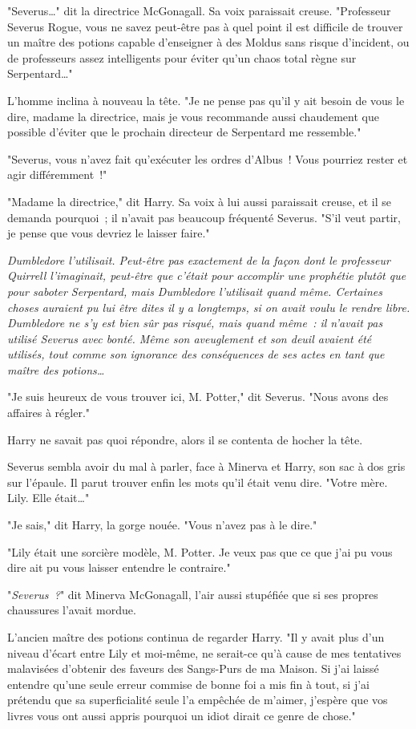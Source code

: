 "Severus…" dit la directrice McGonagall. Sa voix paraissait creuse. "Professeur Severus Rogue, vous ne savez peut-être pas à quel point il est difficile de trouver un maître des potions capable d'enseigner à des Moldus sans risque d'incident, ou de professeurs assez intelligents pour éviter qu'un chaos total règne sur Serpentard…"

L'homme inclina à nouveau la tête. "Je ne pense pas qu'il y ait besoin de vous le dire, madame la directrice, mais je vous recommande aussi chaudement que possible d'éviter que le prochain directeur de Serpentard me ressemble."

"Severus, vous n'avez fait qu'exécuter les ordres d'Albus~! Vous pourriez rester et agir différemment~!"

"Madame la directrice," dit Harry. Sa voix à lui aussi paraissait creuse, et il se demanda pourquoi~; il n'avait pas beaucoup fréquenté Severus. "S'il veut partir, je pense que vous devriez le laisser faire."

\emph{Dumbledore l'utilisait. Peut-être pas exactement de la façon dont le professeur Quirrell l'imaginait, peut-être que c'était pour accomplir une prophétie plutôt que pour saboter Serpentard, mais Dumbledore l'utilisait quand même. Certaines choses auraient pu lui être dites il y a longtemps, si on avait voulu le rendre libre. Dumbledore ne s'y est bien sûr pas risqué, mais quand même~: il n'avait pas utilisé Severus avec bonté. Même son aveuglement et son deuil avaient été utilisés, tout comme son ignorance des conséquences de ses actes en tant que maître des potions…}

"Je suis heureux de vous trouver ici, M. Potter," dit Severus. "Nous avons des affaires à régler."

Harry ne savait pas quoi répondre, alors il se contenta de hocher la tête.

Severus sembla avoir du mal à parler, face à Minerva et Harry, son sac à dos gris sur l'épaule. Il parut trouver enfin les mots qu'il était venu dire. "Votre mère. Lily. Elle était…"

"Je sais," dit Harry, la gorge nouée. "Vous n'avez pas à le dire."

"Lily était une sorcière modèle, M. Potter. Je veux pas que ce que j'ai pu vous dire ait pu vous laisser entendre le contraire."

"\emph{Severus~?}" dit Minerva McGonagall, l'air aussi stupéfiée que si ses propres chaussures l'avait mordue.

L'ancien maître des potions continua de regarder Harry. "Il y avait plus d'un niveau d'écart entre Lily et moi-même, ne serait-ce qu'à cause de mes tentatives malavisées d'obtenir des faveurs des Sangs-Purs de ma Maison. Si j'ai laissé entendre qu'une seule erreur commise de bonne foi a mis fin à tout, si j'ai prétendu que sa superficialité seule l'a empêchée de m'aimer, j'espère que vos livres vous ont aussi appris pourquoi un idiot dirait ce genre de chose."

